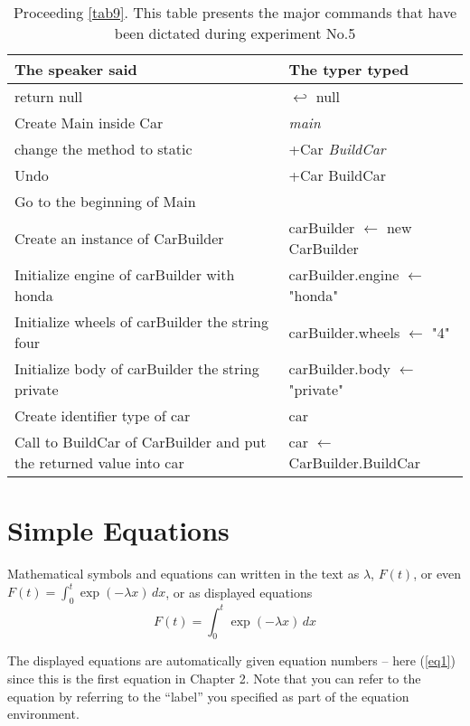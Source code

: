 \begin{table}[H]
	\begin{tabular}{|p{10cm}|p{6cm}|}
		\hline
		\rowcolor[HTML]{9B9B9B} 
		{\color[HTML]{000000} The speaker said} & {\color[HTML]{000000} The typer typed} \\ \hline
		return null & $\hookleftarrow$ null \\ \hline
		Create Main inside Car & \textit{main} \\ \hline
		change the method to static & +Car \textit{BuildCar} \\ \hline
		Undo & +Car BuildCar \\ \hline
		Go to the beginning of Main & \\ \hline
		Create an instance of CarBuilder & carBuilder $\leftarrow$ new CarBuilder \\ \hline
		Initialize engine of carBuilder with honda & carBuilder.engine $\leftarrow$ "honda" \\ \hline
		Initialize wheels of carBuilder the string four & carBuilder.wheels $\leftarrow$ "4" \\ \hline
		Initialize body of carBuilder the string private & carBuilder.body $\leftarrow$ "private" \\ \hline
		Create identifier type of car & car \\ \hline
		Call to BuildCar of CarBuilder and put the returned value into car & car $\leftarrow$ CarBuilder.BuildCar \\ \hline
	\end{tabular}
	\caption{Proceeding \autoref{tab9}. This table presents the major commands that have been dictated during experiment No.5}
	\label{tab10}
\end{table}
\iffalse
\section{Simple Equations}
Mathematical symbols and equations can written in the text as $\lambda$, $F(t)$, or even $F(t)=\int_0^t \exp(-\lambda x)\,dx$, or as displayed equations
\begin{equation}
F(t)=\int_0^t \exp(-\lambda x)\,dx
\label{eq1}
\end{equation}


The displayed equations are automatically given equation numbers -- here (\ref{eq1}) since this is the first equation in Chapter 2. Note that you can refer to the equation by referring to the ``label'' you specified as part of the equation environment.

